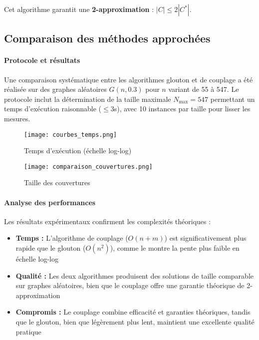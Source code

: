 \documentclass[11pt,a4paper]{article}
\begin{document}
Cet algorithme garantit une \textbf{2-approximation} : $|C| \leq 2|C^*|$.

\subsection{Comparaison des méthodes approchées}

\paragraph{Protocole et résultats}
Une comparaison systématique entre les algorithmes glouton et de couplage a été réalisée sur des graphes aléatoires $G(n,0.3)$ pour $n$ variant de 55 à 547. Le protocole inclut la détermination de la taille maximale $N_{\max}=547$ permettant un temps d'exécution raisonnable ($\leq$3s), avec 10 instances par taille pour lisser les mesures.

\begin{figure}[H]
    \centering
    \begin{minipage}{0.49\textwidth}
        \centering
        \texttt{[image: courbes\_temps.png]}
        \caption{Temps d'exécution (échelle log-log)}
    \end{minipage}
    \hfill
    \begin{minipage}{0.49\textwidth}
        \centering
        \texttt{[image: comparaison\_couvertures.png]}
        \caption{Taille des couvertures}
    \end{minipage}
    \label{fig:exp_comparaison}
\end{figure}

\paragraph{Analyse des performances}
Les résultats expérimentaux confirment les complexités théoriques :
\begin{itemize}
    \item \textbf{Temps :} L'algorithme de couplage ($O(n+m)$) est significativement plus rapide que le glouton ($O(n^2)$), comme le montre la pente plus faible en échelle log-log
    \item \textbf{Qualité :} Les deux algorithmes produisent des solutions de taille comparable sur graphes aléatoires, bien que le couplage offre une garantie théorique de 2-approximation
    \item \textbf{Compromis :} Le couplage combine efficacité et garanties théoriques, tandis que le glouton, bien que légèrement plus lent, maintient une excellente qualité pratique
\end{itemize}
\end{document}
